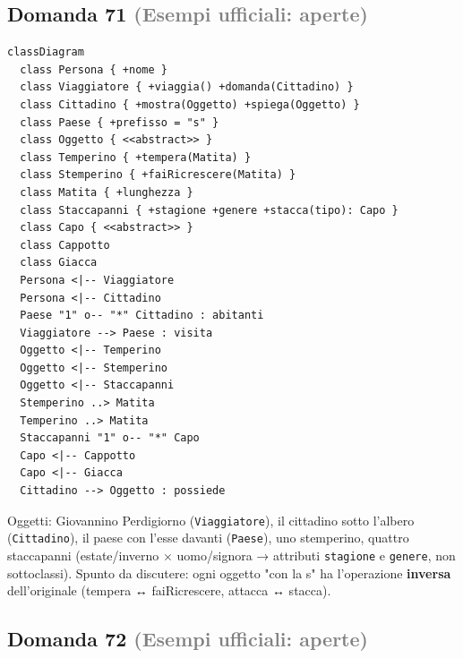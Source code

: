 \documentclass[a4paper,11pt]{article}
\begin{document}
\subsection*{Domanda 71 \hfill {\small \textcolor{gray}{(Esempi ufficiali: aperte)}}}


\begin{verbatim}
classDiagram
  class Persona { +nome }
  class Viaggiatore { +viaggia() +domanda(Cittadino) }
  class Cittadino { +mostra(Oggetto) +spiega(Oggetto) }
  class Paese { +prefisso = "s" }
  class Oggetto { <<abstract>> }
  class Temperino { +tempera(Matita) }
  class Stemperino { +faiRicrescere(Matita) }
  class Matita { +lunghezza }
  class Staccapanni { +stagione +genere +stacca(tipo): Capo }
  class Capo { <<abstract>> }
  class Cappotto
  class Giacca
  Persona <|-- Viaggiatore
  Persona <|-- Cittadino
  Paese "1" o-- "*" Cittadino : abitanti
  Viaggiatore --> Paese : visita
  Oggetto <|-- Temperino
  Oggetto <|-- Stemperino
  Oggetto <|-- Staccapanni
  Stemperino ..> Matita
  Temperino ..> Matita
  Staccapanni "1" o-- "*" Capo
  Capo <|-- Cappotto
  Capo <|-- Giacca
  Cittadino --> Oggetto : possiede
\end{verbatim}
Oggetti: Giovannino Perdigiorno (\texttt{Viaggiatore}), il cittadino sotto l'albero (\texttt{Cittadino}), il paese con l'esse davanti (\texttt{Paese}), uno stemperino, quattro staccapanni (estate/inverno × uomo/signora → attributi \texttt{stagione} e \texttt{genere}, non sottoclassi). Spunto da discutere: ogni oggetto "con la s" ha l'operazione \textbf{inversa} dell'originale (tempera ↔ faiRicrescere, attacca ↔ stacca).



\subsection*{Domanda 72 \hfill {\small \textcolor{gray}{(Esempi ufficiali: aperte)}}}
\end{document}

